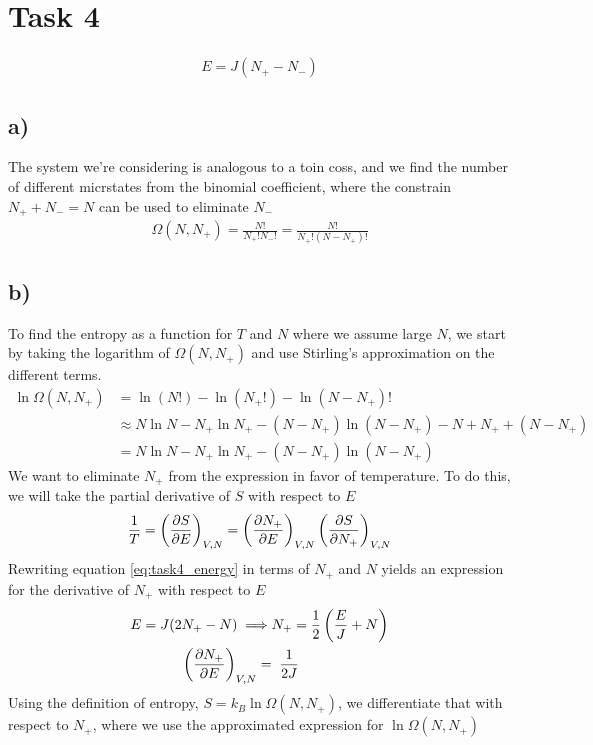 \documentclass[reprint,english,notitlepage,aps,nobalancelastpage,nofootinbib]{revtex4-1}
\newcommand{\closed}[1]{\left(#1\right)}
\newcommand{\tmdv}[4]{\closed{\pdv{#1}{#2}}_{#3,#4}}
\newcommand{\np}{N_+}
\newcommand{\kb}{k_B}
\begin{document}
\section*{\large Task 4}

\begin{align} \label{eq:task4_energy}
	E=J(\np-N_-)
\end{align}

\subsection*{a)}
The system we're considering is analogous to a toin coss, and we find the number of different micrstates from the binomial coefficient, where the constrain $\np+N_-=N$ can be used to eliminate $N_-$
\begin{align*}
	\Omega(N,\np) = \frac{N!}{\np!N_-!}=\frac{N!}{\np!(N-\np)!}
\end{align*}


\subsection*{b)}
To find the entropy as a function for $T$ and $N$ where we assume large $N$, we start by taking the logarithm of $\Omega(N,\np)$ and use Stirling's approximation on the different terms. 
\begin{align*}
	\ln\Omega(N,\np) &= \ln(N!) - \ln(\np!)-\ln(N-\np)! \\ 
	&\approx N\ln N - \np \ln\np - (N-\np)\ln(N-\np) - N + \np + (N-\np) \\
	&=N\ln N - \np \ln\np - (N-\np)\ln(N-\np)
\end{align*}
We want to eliminate $\np$ from the expression in favor of temperature. To do this, we will take the partial derivative of $S$ with respect to $E$
\begin{align*}
	\frac{1}{T}=\tmdv{S}{E}{V}{N}=\tmdv{\np}{E}{V}{N}\tmdv{S}{\np}{V}{N}
\end{align*}
Rewriting equation \eqref{eq:task4_energy} in terms of $\np$ and $N$ yields an expression for the derivative of $\np$ with respect to $E$
\begin{align*}
	E = J(2\np-N) \implies& \np = \frac{1}{2}\closed{\frac{E}{J}+N} \\ 
	\tmdv{\np}{E}{V}{N} =&\;\; \frac{1}{2J}
\end{align*}
Using the definition of entropy, $S = \kb \ln\Omega(N,\np)$, we differentiate that with respect to $\np$, where we use the approximated expression for $\ln\Omega(N,\np)$
\end{document}

